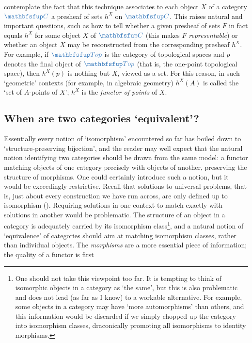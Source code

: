 contemplate the fact that this technique associates to each object $X$
of a category $\categ{C}$ a presheaf of sets $h^X$ on
$\categ{C}$. This raises natural and important questions, such as how
to tell whether a given presheaf of sets $F$ in fact equals $h^X$ for
some object $X$ of $\categ{C}$ (this makes $F$ \emph{representable})
or whether an object $X$ may be reconstructed from the corresponding
presheaf $h^X$. For example, if $\categ{Top}$ is the category of
topological spaces and $p$ denotes the final object of $\categ{Top}$
(that is, the one-point topological space), then $h^X(p)$ is nothing
but $X$, viewed as a set. For this reason, in such `geometric'
contexts (for example, in algebraic geometry) $h^X(A)$ is called the
`set of $A$-points of $X$'; $h^X$ is the \emph{functor of points} of
$X$.

\subsection{When are two categories `equivalent'?}
\label{subsec:linrep:equivalence-of-categories}
Essentially every notion of `isomorphism' encountered so far has
boiled down to `structure-preserving bijection', and the reader may
well expect that the natural notion identifying two categories should
be drawn from the same model: a functor matching objects of one
category precisely with objects of another, preserving the structure
of morphisms.  One could certainly introduce such a notion, but it
would be exceedingly restrictive. Recall that solutions to universal
problems, that is, just about every construction we have run across,
are only defined up to isomorphism
(). Requiring solutions in one
context to match exactly with solutions in another would be
problematic. The structure of an object in a category is adequately
carried by its isomorphism class\footnote{One should not take this
  viewpoint too far.  It is tempting to think of isomorphic objects in
  a category as `the same', but this is also problematic and does not
  lead (as far as I know) to a workable alternative. For example, some
  objects in a category may have `more automorphisms' than others, and
  this information would be discarded if we simply chopped up the
  category into isomorphism classes, draconically promoting all
  isomorphisms to identity morphisms.}, and a natural notion of
`equivalence' of categories should aim at matching isomorphism
classes, rather than individual objects. The \emph{morphisms} are a
more essential piece of information; the quality of a functor is first
